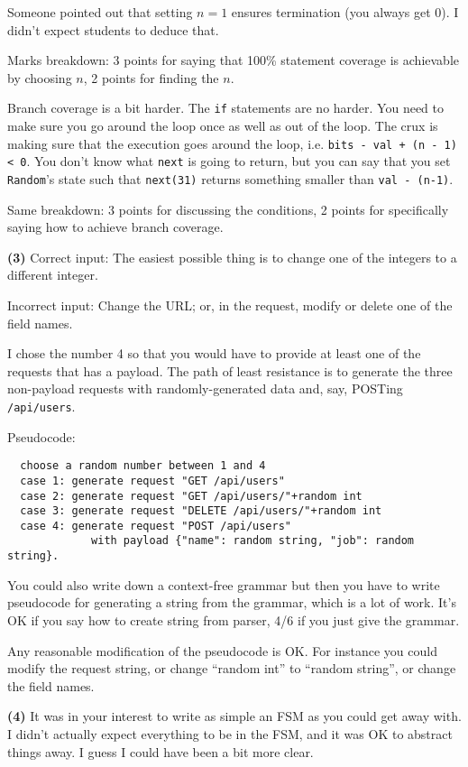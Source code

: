 \documentclass[11pt,onecolumn,letterpaper]{article}
\newcounter{qNum}
\newcommand{\q}[1]{%
\textbf{(#1)}\stepcounter{qNum}}
\begin{document}
Someone pointed out that setting $n=1$ ensures termination (you always get 0).
I didn't expect students to deduce that.

Marks breakdown: 3 points for saying that 100\% statement coverage
is achievable by choosing $n$, 2 points for finding the $n$.

Branch coverage is a bit harder. The {\tt if} statements are no harder. You need to make sure you go
around the loop once as well as out of the loop. The crux is making sure that the execution
goes around the loop, i.e. {\tt bits - val + (n - 1) < 0}. You don't know what {\tt next} is going to return,
but you can say that you set {\tt Random}'s state such that {\tt next(31)} returns something smaller than
{\tt val - (n-1)}. 

Same breakdown: 3 points for discussing the conditions, 2 points for specifically
saying how to achieve branch coverage.

\q{3}
Correct input: The easiest possible thing is to change one of the integers to a
different integer.

Incorrect input: Change the URL; or, in the request, modify or delete one of the field names.

I chose the number 4 so that you would have to provide at least one of the requests
that has a payload. The path of least resistance is to generate the three non-payload
requests with randomly-generated data and, say, POSTing {\tt /api/users}.

Pseudocode:
\begin{verbatim}
  choose a random number between 1 and 4
  case 1: generate request "GET /api/users"
  case 2: generate request "GET /api/users/"+random int
  case 3: generate request "DELETE /api/users/"+random int
  case 4: generate request "POST /api/users" 
             with payload {"name": random string, "job": random string}.
\end{verbatim}

You could also write down a context-free grammar but then you have to write
pseudocode for generating a string from the grammar, which is a lot of work.
It's OK if you say how to create string from parser, 4/6 if you just give the grammar.

Any reasonable modification of the pseudocode is OK. For instance you could
modify the request string, or change ``random int'' to ``random string'', or
change the field names.

\newpage
\q{4} It was in your interest to write as simple an FSM as you could
get away with. I didn't actually expect everything to be in the FSM,
and it was OK to abstract things away. I guess I could have been a bit more clear.
\end{document}
